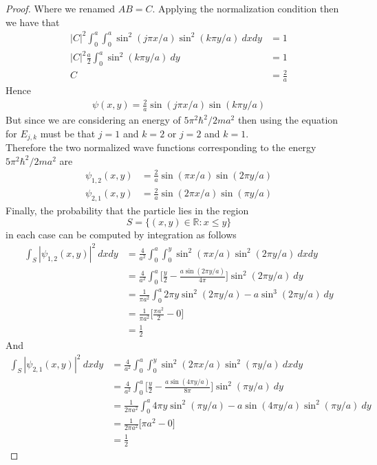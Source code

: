 \documentclass[11pt]{article}
\newcommand{\R}{\mathbb{R}}
\theoremstyle{definition}
\begin{document}
\begin{proof}{2.3}
Where we renamed $AB = C$. Applying the normalization condition then we have
that
\begin{align*}
    |C|^2\int_{0}^{a}\int_{0}^{a}\sin^2(j\pi x/a) \sin^2(k\pi y/a)~dxdy &= 1\\
    |C|^2 \frac{a}{2}\int_{0}^{a}\sin^2(k\pi y/a)~dy &= 1\\
    C &= \frac{2}{a}
\end{align*} 
Hence
\begin{align*}
    \psi(x,y) = \frac{2}{a}\sin(j\pi x/a)\sin(k\pi y/a)
\end{align*}
But since we are considering an energy of $5\pi^2\hbar^2/2ma^2$ then using the
equation for $E_{j,k}$ must be that $j = 1$ and $k = 2$ or $j = 2$ and $k = 1$.
\\
Therefore the two normalized wave functions corresponding to the energy 
$5\pi^2\hbar^2/2ma^2$ are
\begin{align*}
    \psi_{1,2}(x,y) &= \frac{2}{a}\sin(\pi x/a)\sin(2\pi y/a)\\
    \psi_{2,1}(x,y) &= \frac{2}{a}\sin(2\pi x/a)\sin(\pi y/a)
\end{align*}
Finally, the probability that the particle lies in the region 
$$S = \{(x,y) \in \R : x \leq y\}$$
in each case can be computed by integration as follows
\begin{align*}
    \int_S |\psi_{1,2}(x,y)|^2~dxdy
    &= \frac{4}{a^2}\int_0^a\int_0^y \sin^2(\pi x/a)\sin^2(2\pi y/a)~dxdy\\
    &= \frac{4}{a^2}\int_0^a
    \bigg[\frac{y}{2} - \frac{a\sin(2\pi y/a)}{4\pi}\bigg]\sin^2(2\pi y/a)~dy\\
    &= \frac{1}{\pi a^2}\int_0^a
    2\pi y\sin^2(2\pi y/a) - a\sin^3(2\pi y/a)~dy\\
    &= \frac{1}{\pi a^2} \bigg[\frac{\pi a^2}{2} - 0\bigg]\\
    &= \frac{1}{2}
\end{align*}
And
\begin{align*}
    \int_S |\psi_{2,1}(x,y)|^2~dxdy
    &= \frac{4}{a^2}\int_0^a\int_0^y \sin^2(2\pi x/a)\sin^2(\pi y/a)~dxdy\\
    &= \frac{4}{a^2}\int_0^a
    \bigg[\frac{y}{2} - \frac{a\sin(4\pi y/a)}{8\pi}\bigg]\sin^2(\pi y/a)~dy\\
    &= \frac{1}{2\pi a^2}\int_0^a
    4\pi y\sin^2(\pi y/a) - a\sin(4\pi y/a)\sin^2(\pi y/a)~dy\\
    &= \frac{1}{2\pi a^2} \bigg[\pi a^2 - 0\bigg]\\
    &= \frac{1}{2}
\end{align*}
\end{proof}
\end{document}
